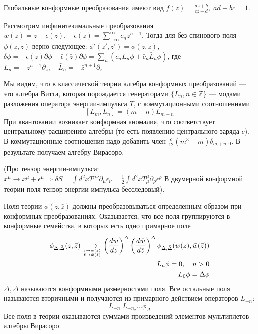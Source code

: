 \documentclass[a4paper,12pt]{article}
\theoremstyle{definition} \newtheorem{Def}{Definition}
\begin{document}
Глобальные конформные преобразования имеют вид $f(z)=\frac{az+b}{cz+d},\; ad-bc=1$. 

Рассмотрим инфинитезимальные преобразования $w(z)=z+\epsilon(z),\quad
\epsilon(z)=\sum_{-\infty}^{\infty}c_nz^{n+1}$. 
Тогда для без-спинового поля $\phi(z,\bar z)$ верно следующее: $\phi'(z',\bar z')=\phi(z,\bar z)$,
$\delta\phi=-\epsilon(z)\partial\phi-\bar \epsilon(\bar z)\bar \partial \phi=\sum_n(c_n L_n\phi+\bar
c_n\bar L_n\phi)$, где $L_n=-z^{n+1}\partial_z,\quad \bar L_n=-\bar z^{n+1}\partial_{\bar z}$

Мы видим, что в классической теории алгебра конформных преобразований --- это алгебра Витта, которая
порождается генераторами $\{L_n, n\in \mathbb{Z}\}$ --- модами разложения оператора энергии-импульса $T$, с
коммутационными соотношениями
\begin{equation}
  \label{eq:2}
  [L_m,L_n]=(m-n)L_{m+n}
\end{equation}
При квантовании возникает конформная аномалия, что соответствует центральному расширению алгебры (то
есть появлению центрального заряда $c$). В коммутационные соотношения надо добавить член
$\frac{c}{12}(m^3-m)\delta_{m+n,0}$. В результате получаем алгебру Вирасоро.

(Про тензор энергии-импульса:
$x^{\mu}\to x^{\mu}+\epsilon^{\mu}\Rightarrow \delta S=\int d^2 x
T^{\mu\nu}\partial_{\mu}\epsilon_{\nu}=
\frac{1}{2}\int d^2 xT_{\mu}^{\mu}\partial_{\rho}\epsilon^{\rho}$
В двумерной конформной теории поля тензор энергии-импульса бесследовый).

Поля теории $\phi(z,\bar z)$ должны преобразовываться определенным образом при конформных преобразованиях.
Оказывается, что все поля группируются в конформные семейства, в которых есть одно примарное поле
\begin{equation}
  \label{eq:3}
  \begin{split}
    \phi_{\Delta,\bar \Delta}(z,\bar z)\underset{
      \genfrac{}{}{0pt}{}{z\to w(z)}
        {\bar z \to \bar w(\bar z)}
    }
    {\longrightarrow} \left(\frac{dw}{dz}\right)^{\Delta}\left(\frac{d\bar w}{d\bar
        z}\right)^{\bar\Delta}\phi_{\Delta,\bar \Delta}(w(z),\bar w(\bar z))\\
    L_n \phi=0,\quad n>0\\
    L_0 \phi=\Delta \phi\\
  \end{split}
\end{equation}
$\Delta, \bar \Delta$ называются конформными размерностями поля.
Все остальные поля называются вторичными и получаются из примарного действием операторов $L_{-n}$:
\begin{equation}
  \label{eq:67}
  L_{-n_1}L_{-n_2}\dots \phi_{\Delta}
\end{equation}
Все поля в теории оказываются суммами произведений элементов мультиплетов алгебры Вирасоро.
\end{document}
